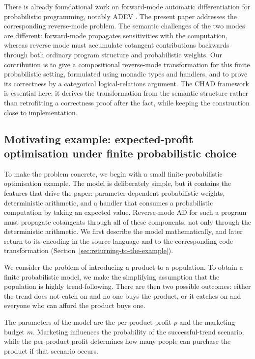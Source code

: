 \documentclass[11pt,a4paper]{article}
\theoremstyle{definition}
\theoremstyle{remark}
\begin{document}
There is already foundational work on forward-mode automatic differentiation
for probabilistic programming, notably ADEV
\cite{lewADEVSoundAutomatic2023}. The present paper addresses the corresponding
reverse-mode problem. The semantic challenges of the two modes are different:
forward-mode propagates sensitivities with the computation, whereas reverse
mode must accumulate cotangent contributions backwards through both ordinary
program structure and probabilistic weights.
Our contribution is to give a
compositional reverse-mode transformation for this finite probabilistic
setting, formulated using monadic types and handlers, and to prove its
correctness by a categorical logical-relations argument. The CHAD framework is
essential here: it derives the transformation from the semantic structure
rather than retrofitting a correctness proof after the fact, while keeping
the construction close to implementation.

\subsection{Motivating example: expected-profit optimisation under finite probabilistic choice}
\label{sec:motivating-example}

To make the problem concrete, we begin with a small finite probabilistic
optimisation example. The model is deliberately simple, but it contains the
features that drive the paper: parameter-dependent probabilistic weights,
deterministic arithmetic, and a handler that consumes a probabilistic
computation by taking an expected value. Reverse-mode AD for such a program
must propagate cotangents through all of these components, not only through the
deterministic arithmetic. We first describe the model mathematically, and later
return to its encoding in the source language and to the corresponding code
transformation (Section~\ref{sec:returning-to-the-example}).

We consider the problem of introducing a product to a population. To obtain a
finite probabilistic model, we make the simplifying assumption that the
population is highly trend-following. There are then two possible outcomes:
either the trend does not catch on and no one buys the product, or it catches
on and everyone who can afford the product buys one.

The parameters of the model are the per-product profit \(p\) and the marketing
budget \(m\). Marketing influences the probability of the successful-trend
scenario, while the per-product profit determines how many people can purchase
the product if that scenario occurs.
\end{document}
